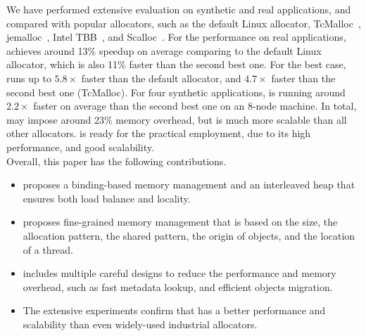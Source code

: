 


We have performed extensive evaluation on synthetic and real applications, and compared \NM{} with popular allocators, such as the default Linux allocator, TcMalloc~\cite{tcmalloc}, jemalloc~\cite{jemalloc}, Intel TBB~\cite{tbb}, and Scalloc~\cite{Scalloc}. For the performance on real applications, \NM{} achieves around 13\% speedup on average comparing to the default Linux allocator, which is also 11\% faster than the second best one. For the best case, \NM{} runs up to $5.8\times$ faster than the default allocator, and $4.7\times$ faster than the second best one (TcMalloc). For four synthetic applications, \NM{} is running around $2.2\times$ faster on average than the second best one on an 8-node machine. In total, \NM{} may impose around 23\% memory overhead, but is much more scalable than all other allocators.  \NM{} is ready for the practical employment, due to its high performance, and good scalability. \\

Overall, this paper has the following contributions. 

\begin{itemize}
\item \NM{} proposes a binding-based memory management and an interleaved heap that ensures both load balance and locality.  
\item \NM{} proposes fine-grained memory management that is based on the size, the allocation pattern, the shared pattern, the origin of objects, and the location of a thread. 

\item \NM{} includes multiple careful designs to reduce the performance and memory overhead, such as fast metadata lookup, and efficient objects migration. 

\item The extensive experiments confirm that \NM{} has a better performance and scalability than even widely-used industrial allocators. 
\end{itemize}

